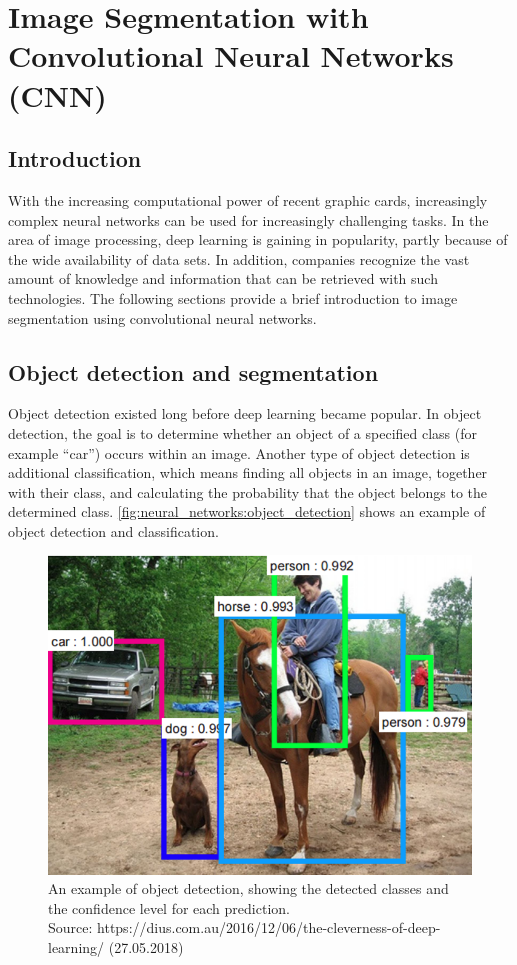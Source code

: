 
\chapter{Image Segmentation with Convolutional Neural Networks (CNN)}\label{chp:segmentation_with_neural_networks}
\section{Introduction}
With the increasing computational power of recent graphic cards, increasingly complex neural networks can be used for increasingly challenging tasks. In the area of image processing, deep learning is gaining in popularity, partly because of the wide availability of data sets. In addition, companies recognize the vast amount of knowledge and information that can be retrieved with such technologies. The following sections provide a brief introduction to image segmentation using convolutional neural networks.

\section{Object detection and segmentation}
Object detection existed long before deep learning became popular. In object detection, the goal is to determine whether an object of a specified class (for example “car”) occurs within an image. Another type of object detection is additional classification, which means finding all objects in an image, together with their class, and calculating the probability that the object belongs to the determined class. \autoref{fig:neural_networks:object_detection} shows an example of object detection and classification.

\begin{figure}[H]
    \centering
	\includegraphics[width=0.6\linewidth]{chapters/neural_networks/images/object_detection.png}
	\caption{An example of object detection, showing the detected classes and the confidence level for each prediction.\\ Source: https://dius.com.au/2016/12/06/the-cleverness-of-deep-learning/ (27.05.2018)}
	\label{fig:neural_networks:object_detection}
\end{figure}

